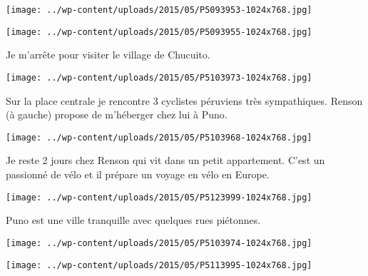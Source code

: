 \begin{center} \texttt{[image: ../wp-content/uploads/2015/05/P5093953-1024x768.jpg]} \end{center}

 

 

\begin{center} \texttt{[image: ../wp-content/uploads/2015/05/P5093955-1024x768.jpg]} \end{center}

 

 Je m'arrête pour visiter le village de Chucuito. 

 

\begin{center} \texttt{[image: ../wp-content/uploads/2015/05/P5103973-1024x768.jpg]} \end{center}

 

 Sur la place centrale je rencontre 3 cyclistes péruviens très sympathiques. Renson (à gauche) propose de m'héberger chez lui à Puno. 

 

\begin{center} \texttt{[image: ../wp-content/uploads/2015/05/P5103968-1024x768.jpg]} \end{center}

 

 Je reste 2 jours chez Renson qui vit dans un petit appartement. C'est un passionné de vélo et il prépare un voyage en vélo en Europe. 

 

\begin{center} \texttt{[image: ../wp-content/uploads/2015/05/P5123999-1024x768.jpg]} \end{center}

 

 Puno est une ville tranquille avec quelques rues piétonnes. 

 

\begin{center} \texttt{[image: ../wp-content/uploads/2015/05/P5103974-1024x768.jpg]} \end{center}

 

 

\begin{center} \texttt{[image: ../wp-content/uploads/2015/05/P5113995-1024x768.jpg]} \end{center}

